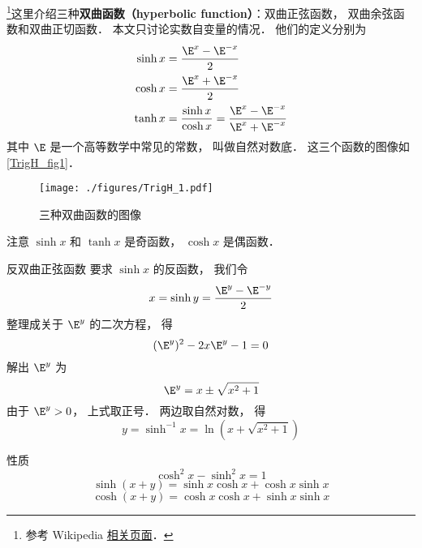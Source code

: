 

\footnote{参考 Wikipedia \href{https://en.wikipedia.org/wiki/Hyperbolic_functions}{相关页面}．}这里介绍三种\textbf{双曲函数（hyperbolic function）}：双曲正弦函数， 双曲余弦函数和双曲正切函数． 本文只讨论实数自变量的情况． 他们的定义分别为
\begin{align}
\sinh x &= \frac{\E^x - \E^{-x}}{2}\\
\cosh x &= \frac{\E^x + \E^{-x}}{2}\\
\tanh x &= \frac{\sinh x}{\cosh x} = \frac{\E^x - \E^{-x}}{\E^x + \E^{-x}}
\end{align}
其中 $\E$ 是一个高等数学中常见的常数， 叫做自然对数底． 这三个函数的图像如\autoref{TrigH_fig1}．

\begin{figure}[ht]
\centering
\texttt{[image: ./figures/TrigH\_1.pdf]}
\caption{三种双曲函数的图像} \label{TrigH_fig1}
\end{figure}

注意 $\sinh x$ 和 $\tanh x$ 是奇函数， $\cosh x$ 是偶函数．

\begin{example}{反双曲正弦函数}\label{TrigH_ex1}
要求 $\sinh x$ 的反函数， 我们令
\begin{equation}
x = \sinh y =  \frac{\E^y - \E^{-y}}{2}
\end{equation}
整理成关于 $\E^y$ 的二次方程， 得
\begin{equation}
(\E^y)^2 - 2x \E^y - 1 = 0
\end{equation}
解出 $\E^y$ 为
\begin{equation}
\E^y = x \pm \sqrt{x^2 + 1}
\end{equation}
由于 $\E^y > 0$， 上式取正号． 两边取自然对数， 得
\begin{equation}
y = \sinh^{-1} x = \ln(x + \sqrt{x^2 + 1})
\end{equation}
\end{example}

性质
\begin{equation}
\cosh^2 x - \sinh^2 x = 1
\end{equation}
\begin{equation}
\sinh(x+y) = \sinh x \cosh x + \cosh x \sinh x
\end{equation}
\begin{equation}
\cosh(x+y) = \cosh x \cosh x + \sinh x \sinh x
\end{equation}
